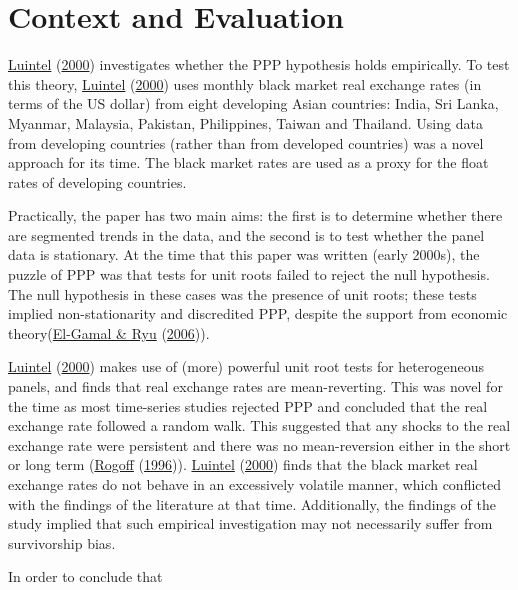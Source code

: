\documentclass[11pt,preprint, authoryear]{elsarticle}
\numberwithin{equation}{section}
\numberwithin{figure}{section}
\numberwithin{table}{section}
\begin{document}
\hypertarget{context-and-evaluation}{%
\section{\texorpdfstring{Context and Evaluation
\label{Context}}{Context and Evaluation }}\label{context-and-evaluation}}

\protect\hyperlink{ref-Kul}{Luintel} (\protect\hyperlink{ref-Kul}{2000})
investigates whether the PPP hypothesis holds empirically. To test this
theory, \protect\hyperlink{ref-Kul}{Luintel}
(\protect\hyperlink{ref-Kul}{2000}) uses monthly black market real
exchange rates (in terms of the US dollar) from eight developing Asian
countries: India, Sri Lanka, Myanmar, Malaysia, Pakistan, Philippines,
Taiwan and Thailand. Using data from developing countries (rather than
from developed countries) was a novel approach for its time. The black
market rates are used as a proxy for the float rates of developing
countries.

Practically, the paper has two main aims: the first is to determine
whether there are segmented trends in the data, and the second is to
test whether the panel data is stationary. At the time that this paper
was written (early 2000s), the puzzle of PPP was that tests for unit
roots failed to reject the null hypothesis. The null hypothesis in these
cases was the presence of unit roots; these tests implied
non-stationarity and discredited PPP, despite the support from economic
theory(\protect\hyperlink{ref-puz}{El-Gamal \& Ryu}
(\protect\hyperlink{ref-puz}{2006})).

\protect\hyperlink{ref-Kul}{Luintel} (\protect\hyperlink{ref-Kul}{2000})
makes use of (more) powerful unit root tests for heterogeneous panels,
and finds that real exchange rates are mean-reverting. This was novel
for the time as most time-series studies rejected PPP and concluded that
the real exchange rate followed a random walk. This suggested that any
shocks to the real exchange rate were persistent and there was no
mean-reversion either in the short or long term
(\protect\hyperlink{ref-rog}{Rogoff}
(\protect\hyperlink{ref-rog}{1996})).
\protect\hyperlink{ref-Kul}{Luintel} (\protect\hyperlink{ref-Kul}{2000})
finds that the black market real exchange rates do not behave in an
excessively volatile manner, which conflicted with the findings of the
literature at that time. Additionally, the findings of the study implied
that such empirical investigation may not necessarily suffer from
survivorship bias.

In order to conclude that
\end{document}

